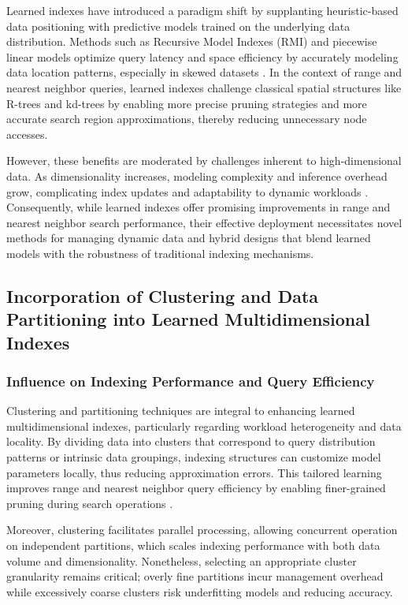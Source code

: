\documentclass[sigconf]{acmart}
\begin{document}
Learned indexes have introduced a paradigm shift by supplanting heuristic-based data positioning with predictive models trained on the underlying data distribution. Methods such as Recursive Model Indexes (RMI) and piecewise linear models optimize query latency and space efficiency by accurately modeling data location patterns, especially in skewed datasets \cite{ref34}. In the context of range and nearest neighbor queries, learned indexes challenge classical spatial structures like R-trees and kd-trees by enabling more precise pruning strategies and more accurate search region approximations, thereby reducing unnecessary node accesses.

However, these benefits are moderated by challenges inherent to high-dimensional data. As dimensionality increases, modeling complexity and inference overhead grow, complicating index updates and adaptability to dynamic workloads \cite{ref34,ref35}. Consequently, while learned indexes offer promising improvements in range and nearest neighbor search performance, their effective deployment necessitates novel methods for managing dynamic data and hybrid designs that blend learned models with the robustness of traditional indexing mechanisms.

\subsection{Incorporation of Clustering and Data Partitioning into Learned Multidimensional Indexes}

\subsubsection{Influence on Indexing Performance and Query Efficiency}

Clustering and partitioning techniques are integral to enhancing learned multidimensional indexes, particularly regarding workload heterogeneity and data locality. By dividing data into clusters that correspond to query distribution patterns or intrinsic data groupings, indexing structures can customize model parameters locally, thus reducing approximation errors. This tailored learning improves range and nearest neighbor query efficiency by enabling finer-grained pruning during search operations \cite{ref34}.

Moreover, clustering facilitates parallel processing, allowing concurrent operation on independent partitions, which scales indexing performance with both data volume and dimensionality. Nonetheless, selecting an appropriate cluster granularity remains critical; overly fine partitions incur management overhead while excessively coarse clusters risk underfitting models and reducing accuracy.
\end{document}
